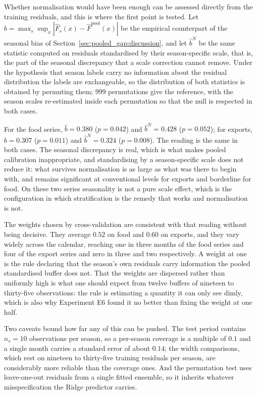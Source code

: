 Whether normalisation would have been enough can be assessed directly
from the training residuals, and this is where the first point is
tested.  Let $\hat{b} = \max_s \sup_x |\hat{F}_s(x) -
\hat{F}^{\text{pool}}(x)|$ be the empirical counterpart of the seasonal
bias of Section~\ref{sec:pooled_gap:discussion}, and let $\hat{b}^{N}$ be
the same statistic computed on residuals standardised by their
season-specific scale, that is, the part of the seasonal discrepancy that
a scale correction cannot remove.  Under the hypothesis that season
labels carry no information about the residual distribution the labels
are exchangeable, so the distribution of both statistics is obtained by
permuting them; $999$ permutations give the reference, with the season
scales re-estimated inside each permutation so that the null is respected
in both cases.

For the food series, $\hat{b} = 0.380$ ($p = 0.042$) and
$\hat{b}^{N} = 0.428$ ($p = 0.052$); for exports, $\hat{b} = 0.307$
($p = 0.011$) and $\hat{b}^{N} = 0.324$ ($p = 0.008$).  The reading is
the same in both cases.  The seasonal discrepancy is real, which is what
makes pooled calibration inappropriate, and standardising by a
season-specific scale does not reduce it: what survives normalisation is
as large as what was there to begin with, and remains significant at
conventional levels for exports and borderline for food.  On these two
series seasonality is not a pure scale effect, which is the configuration
in which stratification is the remedy that works and normalisation is
not.

The weights chosen by cross-validation are consistent with that reading
without being decisive.  They average $0.52$ on food and $0.60$ on
exports, and they vary widely across the calendar, reaching one in three
months of the food series and four of the export series and zero in
three and two respectively.  A weight at one is the rule declaring that
the season's own residuals carry information the pooled standardised
buffer does not.  That the weights are dispersed rather than uniformly
high is what one should expect from twelve buffers of nineteen to
thirty-five observations: the rule is estimating a quantity it can only
see dimly, which is also why Experiment E6 found it no better than
fixing the weight at one half.

Two caveats bound how far any of this can be pushed.  The test period
contains $n_s = 10$ observations per season, so a per-season coverage is
a multiple of $0.1$ and a single month carries a standard error of about
$0.14$; the width comparisons, which rest on nineteen to thirty-five
training residuals per season, are considerably more reliable than the
coverage ones.  And the permutation test uses leave-one-out residuals
from a single fitted ensemble, so it inherits whatever misspecification
the Ridge predictor carries.
